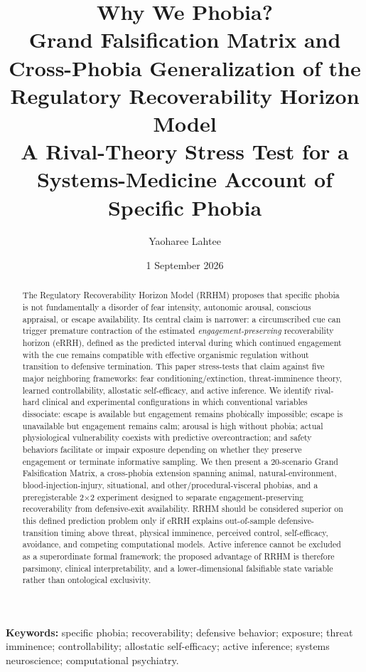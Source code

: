 \documentclass[10pt]{article}
\title{\textbf{Why We Phobia?}\\[0.35em]
\large Grand Falsification Matrix and Cross-Phobia Generalization of the Regulatory Recoverability Horizon Model\\[0.2em]
\normalsize A Rival-Theory Stress Test for a Systems-Medicine Account of Specific Phobia}
\author{Yaoharee Lahtee}
\date{1 September 2026}
\begin{document}
\maketitle

\begin{abstract}
The Regulatory Recoverability Horizon Model (RRHM) proposes that specific phobia is not fundamentally a disorder of fear intensity, autonomic arousal, conscious appraisal, or escape availability. Its central claim is narrower: a circumscribed cue can trigger premature contraction of the estimated \emph{engagement-preserving} recoverability horizon (eRRH), defined as the predicted interval during which continued engagement with the cue remains compatible with effective organismic regulation without transition to defensive termination. This paper stress-tests that claim against five major neighboring frameworks: fear conditioning/extinction, threat-imminence theory, learned controllability, allostatic self-efficacy, and active inference. We identify rival-hard clinical and experimental configurations in which conventional variables dissociate: escape is available but engagement remains phobically impossible; escape is unavailable but engagement remains calm; arousal is high without phobia; actual physiological vulnerability coexists with predictive overcontraction; and safety behaviors facilitate or impair exposure depending on whether they preserve engagement or terminate informative sampling. We then present a 20-scenario Grand Falsification Matrix, a cross-phobia extension spanning animal, natural-environment, blood-injection-injury, situational, and other/procedural-visceral phobias, and a preregisterable 2$\times$2 experiment designed to separate engagement-preserving recoverability from defensive-exit availability. RRHM should be considered superior on this defined prediction problem only if eRRH explains out-of-sample defensive-transition timing above threat, physical imminence, perceived control, self-efficacy, avoidance, and competing computational models. Active inference cannot be excluded as a superordinate formal framework; the proposed advantage of RRHM is therefore parsimony, clinical interpretability, and a lower-dimensional falsifiable state variable rather than ontological exclusivity.
\end{abstract}

\noindent\textbf{Keywords:} specific phobia; recoverability; defensive behavior; exposure; threat imminence; controllability; allostatic self-efficacy; active inference; systems neuroscience; computational psychiatry.
\end{document}
